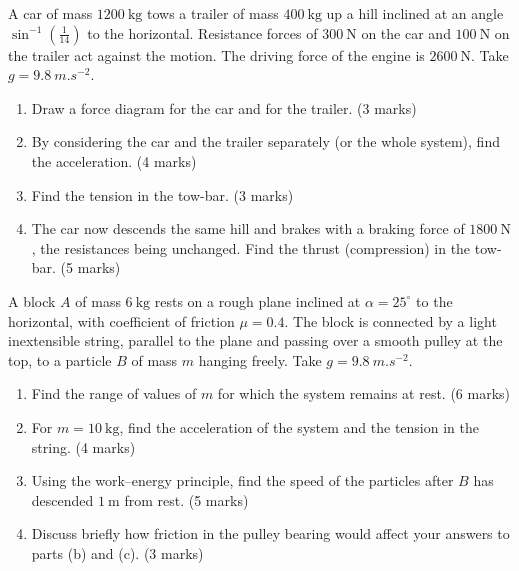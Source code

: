 \documentclass[11pt]{article}
\begin{document}
\begin{exercice}
A car of mass $1200\ \mathrm{kg}$ tows a trailer of mass $400\ \mathrm{kg}$ up a hill inclined at an angle $\sin^{-1}\!\left(\tfrac{1}{14}\right)$ to the horizontal. Resistance forces of $300\ \mathrm{N}$ on the car and $100\ \mathrm{N}$ on the trailer act against the motion. The driving force of the engine is $2600\ \mathrm{N}$. Take $g = \SI{9.8}{m.s^{-2}}$.
\begin{enumerate}
\item[(a)] Draw a force diagram for the car and for the trailer. \hfill (3 marks)
\item[(b)] By considering the car and the trailer separately (or the whole system), find the acceleration. \hfill (4 marks)
\item[(c)] Find the tension in the tow-bar. \hfill (3 marks)
\item[(d)] The car now descends the same hill and brakes with a braking force of $1800\ \mathrm{N}$, the resistances being unchanged. Find the thrust (compression) in the tow-bar. \hfill (5 marks)
\end{enumerate}
\end{exercice}

\begin{exercice}
A block $A$ of mass $6\ \mathrm{kg}$ rests on a rough plane inclined at $\alpha = 25^{\circ}$ to the horizontal, with coefficient of friction $\mu = 0.4$. The block is connected by a light inextensible string, parallel to the plane and passing over a smooth pulley at the top, to a particle $B$ of mass $m$ hanging freely. Take $g = \SI{9.8}{m.s^{-2}}$.
\begin{enumerate}
\item[(a)] Find the range of values of $m$ for which the system remains at rest. \hfill (6 marks)
\item[(b)] For $m = 10\ \mathrm{kg}$, find the acceleration of the system and the tension in the string. \hfill (4 marks)
\item[(c)] Using the work--energy principle, find the speed of the particles after $B$ has descended $1\ \mathrm{m}$ from rest. \hfill (5 marks)
\item[(d)] Discuss briefly how friction in the pulley bearing would affect your answers to parts (b) and (c). \hfill (3 marks)
\end{enumerate}
\end{exercice}
\end{document}
